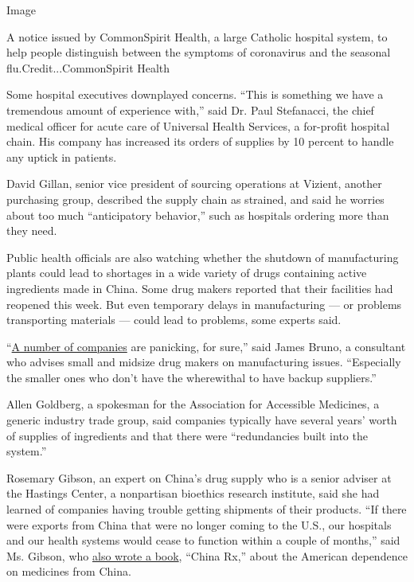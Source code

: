 Image

A notice issued by CommonSpirit Health, a large Catholic hospital
system, to help people distinguish between the symptoms of coronavirus
and the seasonal flu.Credit...CommonSpirit Health

Some hospital executives downplayed concerns. ``This is something we
have a tremendous amount of experience with,'' said Dr. Paul Stefanacci,
the chief medical officer for acute care of Universal Health Services, a
for-profit hospital chain. His company has increased its orders of
supplies by 10 percent to handle any uptick in patients.

David Gillan, senior vice president of sourcing operations at Vizient,
another purchasing group, described the supply chain as strained, and
said he worries about too much ``anticipatory behavior,'' such as
hospitals ordering more than they need.

Public health officials are also watching whether the shutdown of
manufacturing plants could lead to shortages in a wide variety of drugs
containing active ingredients made in China. Some drug makers reported
that their facilities had reopened this week. But even temporary delays
in manufacturing --- or problems transporting materials --- could lead
to problems, some experts said.

``\href{https://cen.acs.org/pharmaceuticals/pharmaceutical-chemicals/Coronavirus-puts-drug-chemical-industry/98/web/2020/02}{A
number of companies} are panicking, for sure,'' said James Bruno, a
consultant who advises small and midsize drug makers on manufacturing
issues. ``Especially the smaller ones who don't have the wherewithal to
have backup suppliers.''

Allen Goldberg, a spokesman for the Association for Accessible
Medicines, a generic industry trade group, said companies typically have
several years' worth of supplies of ingredients and that there were
``redundancies built into the system.''

Rosemary Gibson, an expert on China's drug supply who is a senior
adviser at the Hastings Center, a nonpartisan bioethics research
institute, said she had learned of companies having trouble getting
shipments of their products. ``If there were exports from China that
were no longer coming to the U.S., our hospitals and our health systems
would cease to function within a couple of months,'' said Ms. Gibson,
who
\href{https://www.amazon.com/China-Rx-Exposing-Americas-Dependence/dp/1633883817}{also
wrote a book}, ``China Rx,'' about the American dependence on medicines
from China.

